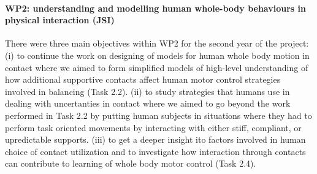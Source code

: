 \paragraph{WP2: understanding and modelling human whole-body behaviours in physical interaction (JSI)}

There were three main objectives within WP2 for the second year of the project: (i) to continue the work on designing of models for human whole body motion in contact where we aimed to form simplified models of high-level understanding of how additional supportive contacts affect human motor control strategies involved in balancing (Task 2.2). (ii) to study strategies that humans use in dealing with uncertanties in contact where we aimed to go beyond the work performed in Task 2.2 by putting human subjects in situations where they had to perform task oriented movements by interacting with either stiff, compliant, or upredictable supports. (iii) to get a deeper insight ito factors involved in human choice of contact utilization and to investigate how interaction through contacts can contribute to learning of whole body motor control (Task 2.4).
